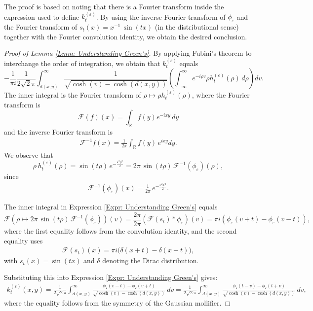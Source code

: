 \documentclass[11pt,twoside,reqno]{amsart} \usepackage{a4wide} \usepackage[T1]{fontenc} \usepackage[utf8]{inputenc} \usepackage{soul}  \usepackage{amsmath} \usepackage{amsfonts} \usepackage{amssymb} \usepackage{mathtools} \usepackage{amsthm} \usepackage{xcolor} \usepackage{graphicx} \usepackage{hyperref} \usepackage{standalone} \usepackage{esint} \usepackage{comment} \usepackage[left=2.3cm,top=3cm,right=2.3cm]{geometry} \usepackage{bm} \usepackage{svg} \usepackage{float} \numberwithin{equation}{section} \theoremstyle{plain} \newtheorem{thm}{Theorem}[section] \newtheorem{theorem}[thm]{Theorem} \newtheorem*{theorem*}{Theorem}\newtheorem{conj}[thm]{Conjecture} \newtheorem{lemma}[thm]{Lemma} \newtheorem{prop}[thm]{Proposition} \newtheorem{proposition}[thm]{Proposition} \newtheorem{cor}[thm]{Corollary} \newtheorem{question}[thm]{Question} \newtheorem{corollary}[thm]{Corollary} \newtheorem{assumption}[thm]{Assumption} \theoremstyle{definition} \newtheorem{defn}[thm]{Definition} \newtheorem{choice}[thm]{Choice} \newtheorem{definition}[thm]{Definition} \newtheorem{ex}[thm]{Example} \newtheorem{notation}[thm]{Notation} \newtheorem*{ack}{Acknowledgements} \theoremstyle{remark} \newtheorem{remark}[thm]{Remark} \newtheorem{bigremark}[thm]{Remark} \usepackage{xcolor} \newcommand{\red}[1]{ {\color{Red}#1} } \newcommand{\blue}[1]{ {\color{Blue}#1} } \author{Kai Hippi} \address{Aalto University, Espoo, Finland} \email{kai.hippi@aalto.fi}
\begin{document}
The proof is based on noting that there is a Fourier transform inside the expression used to define $k_{t}^{(\varepsilon)}$. By using the inverse Fourier transform of $\phi_{\varepsilon}$ and the Fourier transform of $s_{t}(x) = x^{-1} \, \sin(t x)$ (in the distributional sense) together with the Fourier convolution identity, we obtain the desired conclusion.

\begin{proof}[Proof of Lemma \ref{Lmm: Understanding Green's}]
By applying Fubini's theorem to interchange the order of integration, we obtain that $k_{t}^{(\varepsilon)}$ equals
\begin{equation}
\label{Expr: Understanding Green's}
- \frac{1}{\pi i} \frac{1}{2\sqrt{2} \pi} \int_{d(x,y)}^\infty \frac{1}{\sqrt{\cosh(v) - \cosh(d(x,y))}} \left( \int_{-\infty}^{\infty} e^{-i \rho v} \rho h_t^{(\varepsilon)}(\rho) \, d\rho \right) dv.
\end{equation}
The inner integral is the Fourier transform of $\rho \mapsto \rho h_t^{(\varepsilon)}(\rho)$, where the Fourier transform is
$$
\mathcal{F}(f)(x) = \int_{\mathbb{R}} f(y) e^{-i x y} \, dy
$$
and the inverse Fourier transform is
\begin{align*}
	\mathcal{F}^{-1}f(x) = \frac{1}{2 \pi} \int_{\mathbb{R}} f(y) \, e^{ i x y } dy.
\end{align*}
We observe that
$$
\rho \, h_t^{(\varepsilon)}(\rho) = \sin(t \rho) \, e^{-\frac{\varepsilon^2 \rho^2}{2}} = 2\pi \, \sin(t \rho) \, \mathcal{F}^{-1}(\phi_\varepsilon)(\rho),
$$
since
\begin{align*}
	\mathcal{F}^{-1}( \phi_{\varepsilon} )(x) = \frac{1}{2\pi} \, e^{ -\frac{\varepsilon^2 x^2}{2} }.
\end{align*}

The inner integral in Expression \eqref{Expr: Understanding Green's} equals
$$
\mathcal{F}\left( \rho \mapsto 2 \pi \, \sin( t \rho ) \, \mathcal{F}^{-1}(\phi_{\varepsilon}) \right)(v) = \frac{2\pi}{2\pi} \left( \mathcal{F}(s_{t}) \ast \phi_{\varepsilon} \right)(v) = \pi i \left( \phi_{\varepsilon}(v + t) - \phi_{\varepsilon}(v - t) \right),
$$
where the first equality follows from the convolution identity, and the second equality uses
\begin{align*}
\mathcal{F}(s_t)(x) = \pi i \bigl(\delta(x + t) - \delta(x - t)\bigr),
\end{align*}
with \(s_t(x) = \sin(tx)\) and \(\delta\) denoting the Dirac distribution.


Substituting this into Expression \eqref{Expr: Understanding Green's} gives:
\begin{align*}
	k_t^{(\varepsilon)}(x,y) =
	\frac{1}{2 \sqrt{2} \pi} \int_{d(x,y)}^{\infty} \frac{ \phi_{\varepsilon}(v - t) - \phi_{\varepsilon}(v + t) }{ \sqrt{ \cosh(v) - \cosh(d(x,y)) } } \, dv
	=
	\frac{1}{2 \sqrt{2} \pi} \int_{d(x,y)}^{\infty} \frac{ \phi_{\varepsilon}(t - v) - \phi_{\varepsilon}(t+v) }{ \sqrt{ \cosh(v) - \cosh(d(x,y)) } } \, dv,
\end{align*}
where the equality follows from the symmetry of the Gaussian mollifier. 
\end{proof}
\end{document}
